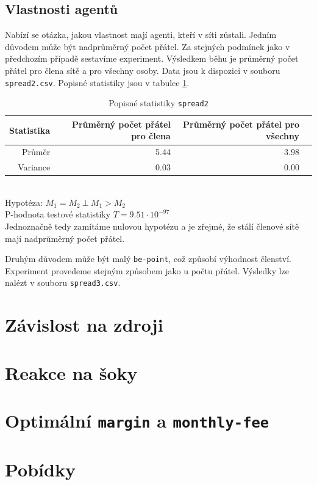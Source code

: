 \documentclass[a4wide,12pt]{report}
\begin{document}
\subsection{Vlastnosti agentů}
Nabízí se otázka, jakou vlastnost mají agenti, kteří v síti zůstali. Jedním důvodem může být nadprůměrný počet přátel. Za stejných podmínek jako v předchozím případě sestavíme experiment. Výsledkem běhu je průměrný počet přátel pro člena sítě a pro všechny osoby. Data jsou k dispozici v souboru \texttt{spread2.csv}. Popisné statistiky jsou v tabulce \ref{fig:spread2_desc}.
\begin{table}[h]
  \begin{center}
  \begin{tabular}{|r|r|r|r|}
  \hline
  Statistika&Průměrný počet přátel pro člena	&Průměrný počet přátel pro všechny\\\hline
  Průměr	&5.44	&3.98\\\hline

  Variance	&0.03	&0.00\\\hline
  \end{tabular}
  \end{center}
  \caption{Popisné statistiky \texttt{spread2}}
  \label{fig:spread2_desc}
\end{table}
\\Hypotéza: $M_1=M_2 ~ \bot ~ M_1>M_2$\\
P-hodnota testové statistiky $T = 9.51\cdot 10^{-97}$\\
Jednoznačně tedy zamítáme nulovou hypotézu a je zřejmé, že stálí členové sítě mají nadprůměrný počet přátel.

Druhým důvodem může být malý \texttt{be-point}, což způsobí výhodnost členství. Experiment provedeme stejným způsobem jako u počtu přátel. Výsledky lze nalézt v souboru \texttt{spread3.csv}.
\section{Závislost na zdroji}
\section{Reakce na šoky}
\section{Optimální \texttt{margin} a \texttt{monthly-fee}}
\section{Pobídky}
\end{document}
